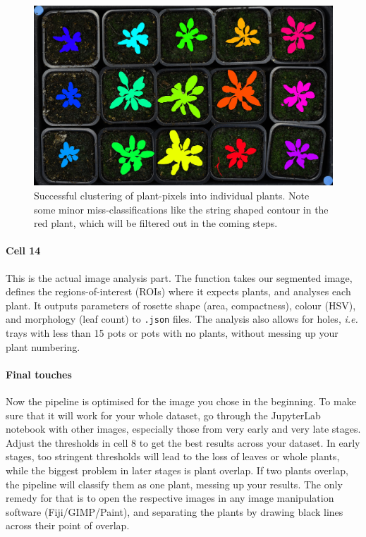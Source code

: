 \documentclass[10pt]{article}
\begin{document}
\begin{figure}[!h]
	\centering
	\includegraphics[width=0.6\linewidth]{clusters}
	\caption[Successfully clustered plants.]{Successful clustering of plant-pixels into individual plants. Note some minor miss-classifications like the string shaped contour in the red plant, which will be filtered out in the coming steps.}
	\label{fig:clusters}
\end{figure}

\paragraph*{Cell 14} This is the actual image analysis part. The function takes our segmented image, defines the regions-of-interest (ROIs) where it expects plants, and analyses each plant. It outputs parameters of rosette shape (area, compactness), colour (HSV), and morphology (leaf count) to \texttt{.json} files. The analysis also allows for holes, \textit{i.e.} trays with less than 15 pots or pots with no plants, without messing up your plant numbering.

\paragraph*{Final touches} Now the pipeline is optimised for the image you chose in the beginning. To make sure that it will work for your whole dataset, go through the JupyterLab notebook with other images, especially those from very early and very late stages. Adjust the thresholds in cell 8 to get the best results across your dataset. In early stages, too stringent thresholds will lead to the loss of leaves or whole plants, while the biggest problem in later stages is plant overlap. If two plants overlap, the pipeline will classify them as one plant, messing up your results. The only remedy for that is to open the respective images in any image manipulation software (Fiji/GIMP/Paint), and separating the plants by drawing black lines across their point of overlap.
\end{document}
